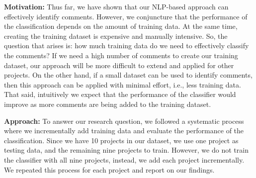 

\vspace{3mm}
\noindent\rqiii
\vspace{3mm}

\noindent \textbf{Motivation:} Thus far, we have shown that our NLP-based approach can effectively identify \SATD comments. However, we conjuncture that the performance of the classification depends on the amount of training data. At the same time, creating the training dataset is expensive and manually intensive. So, the question that arises is: how much training data do we need to effectively classify the \SATD comments? If we need a high number of comments to create our training dataset, our approach will be more difficult to extend and applied for other projects. On the other hand, if a small dataset can be used to identify \SATD comments, then this approach can be applied with minimal effort, i.e., less training data. That said, intuitively we expect that the performance of the classifier would improve as more comments are being added to the training dataset.


\noindent \textbf{Approach:} To answer our research question, we followed a systematic process where we incrementally add training data and evaluate the performance of the classification. Since we have 10 projects in our dataset, we use one project as testing data, and the remaining nine projects to train. However, we do not train the classifier with all nine projects, instead, we add each project incrementally. We repeated this process for each project and report on our findings.




